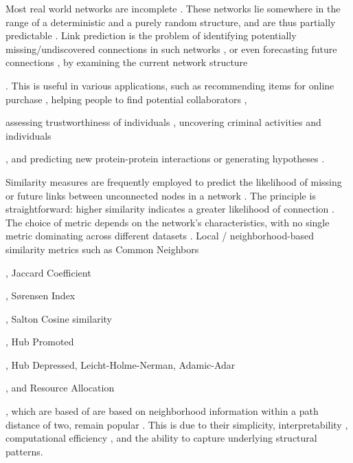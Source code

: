 Most real world networks are incomplete \cite{kim2011network, wang2014link}. These networks lie somewhere in the range of a deterministic and a purely random structure, and are thus partially predictable \cite{lu2015toward}. Link prediction is the problem of identifying potentially missing/undiscovered connections in such networks \cite{marchette2008predicting, kim2011network}, or even forecasting future connections \cite{bringmann2010learning, juszczyszyn2011link}, by examining the current network structure. This is useful in various applications, such as recommending items for online purchase \cite{akcora2011network}, helping people to find potential collaborators \cite{mori2012machine, tang2012cross}, assessing trustworthiness of individuals \cite{alnumay2019trust}, uncovering criminal activities and individuals \cite{berlusconi2016link, lim2019hidden}, and predicting new protein-protein interactions or generating hypotheses \cite{cannistraci2013link, nasiri2021novel}.

Similarity measures are frequently employed to predict the likelihood of missing or future links between unconnected nodes in a network \cite{wang2014link, arrar2023comprehensive}. The principle is straightforward: higher similarity indicates a greater likelihood of connection \cite{wang2014link}. The choice of metric depends on the network's characteristics, with no single metric dominating across different datasets \cite{arrar2023comprehensive, zhou2021progresses}. Local / neighborhood-based similarity metrics such as Common Neighbors, Jaccard Coefficient, S{\o}rensen Index, Salton Cosine similarity, Hub Promoted, Hub Depressed, Leicht-Holme-Nerman, Adamic-Adar, and Resource Allocation, which are based of are based on neighborhood information within a path distance of two, remain popular \cite{arrar2023comprehensive, wang2014link}. This is due to their simplicity, interpretability \cite{pai2019netdx, barbieri2014follow}, computational efficiency \cite{garcia2014link}, and the ability to capture underlying structural patterns.


